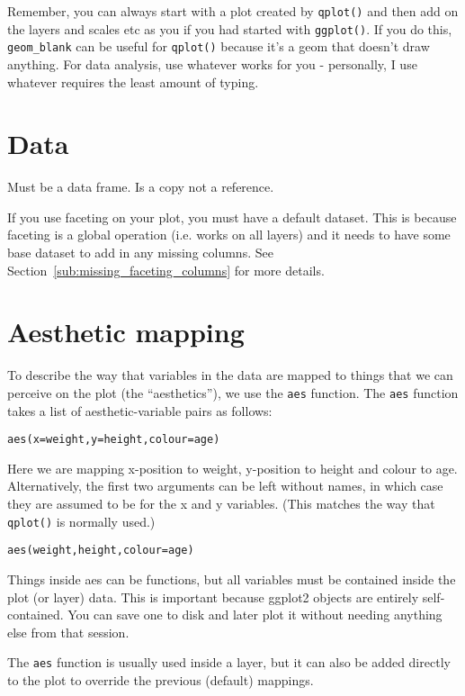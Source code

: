 Remember, you can always start with a plot created by {\tt qplot()} and then add on the layers and scales etc as you if you had started with {\tt ggplot()}.  If you do this, {\tt geom\_blank} can be useful for {\tt qplot()} because it's a geom that doesn't draw anything.  For data analysis, use whatever works for you - personally, I use whatever requires the least amount of typing.

\section{Data}
\label{sec:data}

Must be a data frame.
Is a copy not a reference.

If you use faceting on your plot, you must have a default dataset.  This is because faceting is a global operation (i.e. works on all layers) and it needs to have some base dataset to add in any missing columns.  See Section~\ref{sub:missing_faceting_columns} for more details.

\section{Aesthetic mapping}
\label{sec:aes}

To describe the way that variables in the data are mapped to things that we can perceive on the plot (the ``aesthetics''), we use the {\tt aes} function.  The {\tt aes} function takes a list of aesthetic-variable pairs as follows:

\begin{alltt}
aes(x = weight, y = height, colour = age)
\end{alltt}

Here we are mapping x-position to weight, y-position to height and colour to age.  Alternatively, the first two arguments can be left without names, in which case they are assumed to be for the x and y variables.  (This matches the way that {\tt qplot()} is normally used.)

\begin{alltt}
aes(weight, height, colour = age)
\end{alltt}

Things inside aes can be functions, but all variables must be contained inside the plot (or layer) data.  This is important because ggplot2 objects are entirely self-contained.  You can save one to disk and later plot it without needing anything else from that session.

The {\tt aes} function is usually used inside a layer, but it can also be added directly to the plot to override the previous (default) mappings.  

